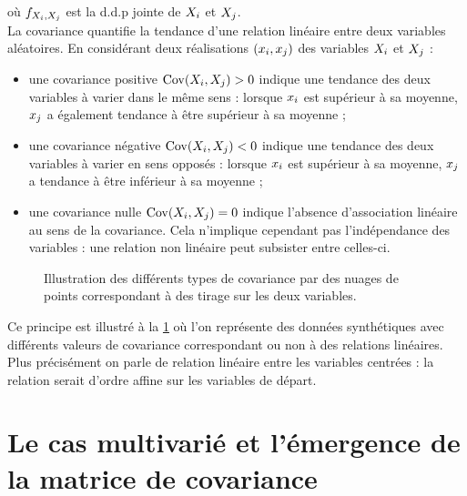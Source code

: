 où $f_{X_i,X_j}$ est la d.d.p jointe de $X_i$ et $X_j$. \\


La covariance quantifie la tendance d'une relation linéaire entre
deux variables aléatoires. En considérant deux réalisations
$(x_{i},x_{j})$ des variables
$X_{i}$ et $X_{j}$ :

\begin{itemize}
  \item une covariance positive
  $\operatorname{\operatorname{Cov}}(X_{i},X_{j})>0$
  indique une tendance des deux variables à varier dans le même sens :
  lorsque $x_{i}$ est supérieur à sa moyenne, $x_{j}$
  a également tendance à être supérieur à sa moyenne ;

  \item une covariance négative
  $\operatorname{\operatorname{Cov}}(X_{i},X_{j})<0$
  indique une tendance des deux variables à varier en sens opposés :
  lorsque $x_{i}$ est supérieur à sa moyenne, $x_{j}$
  a tendance à être inférieur à sa moyenne ;

  \item une covariance nulle
  $\operatorname{\operatorname{Cov}}(X_{i},X_{j})=0$
  indique l'absence d'association linéaire au sens de la covariance.
  Cela n'implique cependant pas l'indépendance des variables :
  une relation non linéaire peut subsister entre celles-ci.
\end{itemize}



\begin{figure}[h]
  \centering
  
  \caption{Illustration des différents types de covariance par des nuages de points correspondant à des tirage sur les deux variables.}
  \label{fig:covariance-types}
\end{figure}



Ce principe est illustré à la \cref{fig:covariance-types} où l'on représente des données synthétiques avec différents valeurs de covariance correspondant ou non à des relations linéaires. Plus précisément on parle de relation linéaire entre les variables centrées : la relation serait d'ordre affine sur les variables de départ.


%
\section{Le cas multivarié et l'émergence de la matrice de covariance}
\label{sec:context-definition-multivariate}

